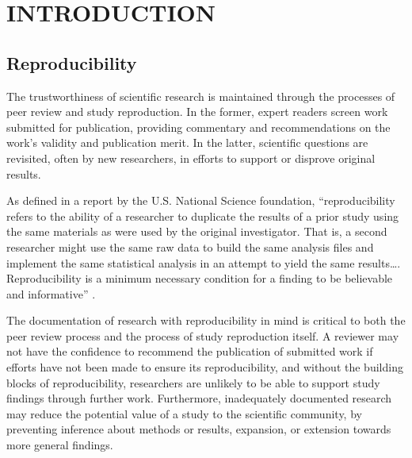 \chapter{INTRODUCTION}

\section{Reproducibility}
The trustworthiness of scientific research is maintained through the
processes of peer review and study reproduction. In the former, expert readers
screen work submitted for publication, providing commentary and recommendations
on the work’s validity and publication merit. In the latter, scientific
questions are revisited, often by new researchers, in efforts to support or
disprove original results.

As defined in a report by the U.S. National Science foundation,
“reproducibility refers to the ability of a researcher to duplicate the results
of a prior study using the same materials as were used by the original
investigator. That is, a second researcher might use the same raw data to build
the same analysis files and implement the same statistical analysis in an
attempt to yield the same results…. Reproducibility is a minimum necessary
condition for a finding to be believable and informative” \parencite[3]{cacioppo_social_2015}.

The documentation of research with reproducibility in mind is critical to
both the peer review process and the process of study reproduction itself. A
reviewer may not have the confidence to recommend the publication of submitted
work if efforts have not been made to ensure its reproducibility, and without
the building blocks of reproducibility, researchers are unlikely to be able to
support study findings through further work. Furthermore, inadequately
documented research may reduce the potential value of a study to the scientific
community, by preventing inference about methods or results, expansion, or
extension towards more general findings.

